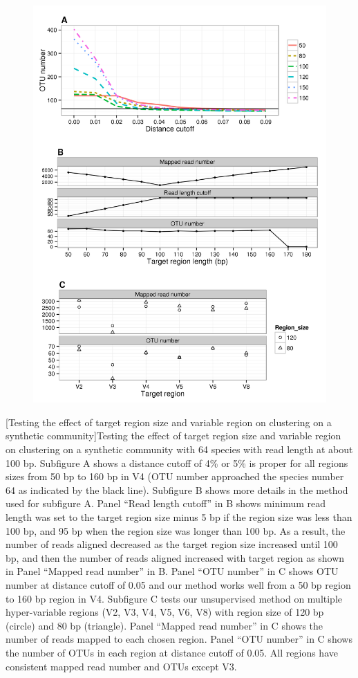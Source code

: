 \documentclass[]{msu-thesis}
\begin{document}
\begin{figure}[tbph!]
  \centering
  \includegraphics[scale=1]{figs/chap2_figS2}
\end{figure}
\clearpage
\SingleSpacing
{}[Testing the effect of target region size and variable region on clustering on a synthetic community]{Testing the effect of target region size and variable region on clustering on a synthetic community with 64 species with read length at about 100 bp. Subfigure A shows a distance cutoff of 4\% or 5\% is proper for all regions sizes from 50 bp to 160 bp in V4 (OTU number approached the species number 64 as indicated by the black line).  Subfigure B shows more details in the method used for subfigure A. Panel ``Read length cutoff'' in B shows minimum read length was set to the target region size minus 5 bp if the region size was less than 100 bp, and 95 bp when the region size was longer than 100 bp. As a result, the number of reads aligned decreased as the target region size increased until 100 bp, and then the number of reads aligned increased with target region as shown in Panel ``Mapped read number'' in B. Panel ``OTU number'' in C shows OTU number at distance cutoff of 0.05 and our method works well from a 50 bp region to 160 bp region in V4. Subfigure C tests our unsupervised method on multiple hyper-variable regions (V2, V3, V4, V5, V6, V8) with region size of 120 bp (circle) and 80 bp (triangle). Panel ``Mapped read number'' in C shows the number of reads mapped to each chosen region. Panel ``OTU number'' in C shows the number of OTUs in each region at distance cutoff of 0.05. All regions have consistent mapped read number and OTUs except V3.}
\end{document}
